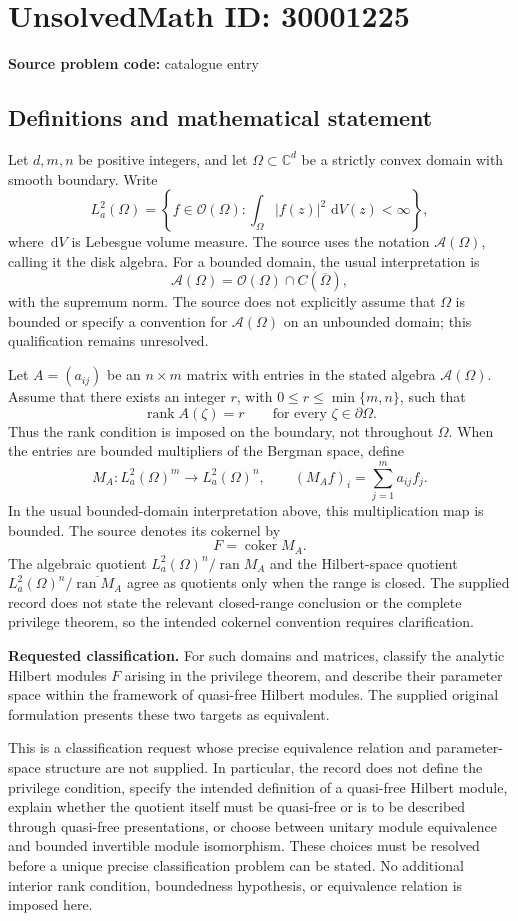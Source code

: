 \documentclass[11pt]{article}
\newcommand{\C}{\mathbb{C}}
\newcommand{\dd}{\,\mathrm{d}}
\begin{document}
\section*{UnsolvedMath ID: 30001225}
\textbf{Source problem code:} catalogue entry
\subsection{Definitions and mathematical statement}
Let \(d,m,n\) be positive integers, and let \(\Omega\subset\C^d\) be a strictly convex domain with smooth boundary. Write
\[
L_a^2(\Omega)=\left\{f\in\mathcal O(\Omega):\int_\Omega |f(z)|^2\,\dd V(z)<\infty\right\},
\]
where \(\dd V\) is Lebesgue volume measure. The source uses the notation \(\mathcal A(\Omega)\), calling it the disk algebra. For a bounded domain, the usual interpretation is
\[
\mathcal A(\Omega)=\mathcal O(\Omega)\cap C(\overline\Omega),
\]
with the supremum norm. The source does not explicitly assume that \(\Omega\) is bounded or specify a convention for \(\mathcal A(\Omega)\) on an unbounded domain; this qualification remains unresolved.

Let \(A=(a_{ij})\) be an \(n\times m\) matrix with entries in the stated algebra \(\mathcal A(\Omega)\). Assume that there exists an integer \(r\), with \(0\le r\le\min\{m,n\}\), such that
\[
\operatorname{rank}A(\zeta)=r\qquad\text{for every }\zeta\in\partial\Omega.
\]
Thus the rank condition is imposed on the boundary, not throughout \(\Omega\). When the entries are bounded multipliers of the Bergman space, define
\[
M_A:L_a^2(\Omega)^m\longrightarrow L_a^2(\Omega)^n,
\qquad
(M_Af)_i=\sum_{j=1}^m a_{ij}f_j.
\]
In the usual bounded-domain interpretation above, this multiplication map is bounded. The source denotes its cokernel by
\[
F=\operatorname{coker}M_A.
\]
The algebraic quotient \(L_a^2(\Omega)^n/\operatorname{ran}M_A\) and the Hilbert-space quotient \(L_a^2(\Omega)^n/\overline{\operatorname{ran}M_A}\) agree as quotients only when the range is closed. The supplied record does not state the relevant closed-range conclusion or the complete privilege theorem, so the intended cokernel convention requires clarification.

\textbf{Requested classification.} For such domains and matrices, classify the analytic Hilbert modules \(F\) arising in the privilege theorem, and describe their parameter space within the framework of quasi-free Hilbert modules. The supplied original formulation presents these two targets as equivalent.

This is a classification request whose precise equivalence relation and parameter-space structure are not supplied. In particular, the record does not define the privilege condition, specify the intended definition of a quasi-free Hilbert module, explain whether the quotient itself must be quasi-free or is to be described through quasi-free presentations, or choose between unitary module equivalence and bounded invertible module isomorphism. These choices must be resolved before a unique precise classification problem can be stated. No additional interior rank condition, boundedness hypothesis, or equivalence relation is imposed here.
\end{document}
